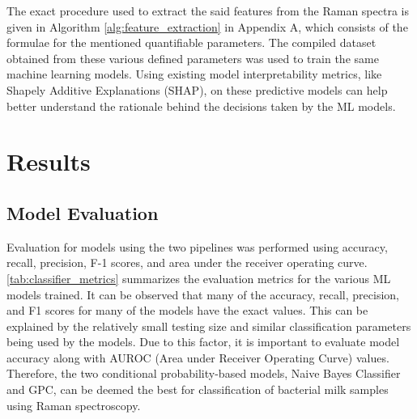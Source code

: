 \noindent The exact procedure used to extract the said features from the Raman spectra is given in Algorithm \autoref{alg:feature_extraction} in Appendix A, which consists of the formulae for the mentioned quantifiable parameters. The compiled dataset obtained from these various defined parameters was used to train the same machine learning models. Using existing model interpretability metrics, like Shapely Additive Explanations (SHAP), on these predictive models can help better understand the rationale behind the decisions taken by the ML models. 

\section{Results}
\subsection{Model Evaluation}

Evaluation for models using the two pipelines was performed using accuracy, recall, precision, F-1 scores, and area under the receiver operating curve. \autoref{tab:classifier_metrics} summarizes the evaluation metrics for the various ML models trained. It can be observed that many of the accuracy, recall, precision, and F1 scores for many of the models have the exact values. This can be explained by the relatively small testing size and similar classification parameters being used by the models. Due to this factor, it is important to evaluate model accuracy along with AUROC (Area under Receiver Operating Curve) values. Therefore, the two conditional probability-based models, Naive Bayes Classifier and GPC, can be deemed the best for classification of bacterial milk samples using Raman spectroscopy. \\

\begin{table}[htbp]
\raggedright
\caption{Performance comparison of various classifiers}
\label{tab:classifier_metrics}
\end{table}


